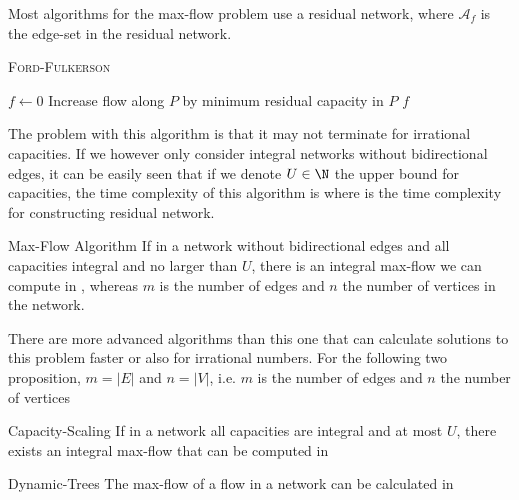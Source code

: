 \newpage
{}

Most algorithms for the max-flow problem use a residual network, where $\mathcal{A}_f$ is the edge-set in the residual network.

\begin{algorithm}
    \caption{\textsc{Ford-Fulkerson}}
    \begin{algorithmic}[1]
            \State $f \gets 0$ 
             
                \State Increase flow along $P$ by minimum residual capacity in $P$
            \EndWhile
            \State \Return $f$ 
        \EndProcedure
    \end{algorithmic}
\end{algorithm}

The problem with this algorithm is that it may not terminate for irrational capacities. If we however only consider integral networks without bidirectional edges, it can be easily seen that if we denote $U \in \N$ the upper bound for capacities, the time complexity of this algorithm is  where  is the time complexity for constructing residual network.
\begin{theorem}[]{Max-Flow Algorithm}
    If in a network without bidirectional edges and all capacities integral and no larger than $U$, there is an integral max-flow we can compute in , whereas $m$ is the number of edges and $n$ the number of vertices in the network.
\end{theorem}

There are more advanced algorithms than this one that can calculate solutions to this problem faster or also for irrational numbers.
For the following two proposition, $m = |E|$ and $n = |V|$, i.e. $m$ is the number of edges and $n$ the number of vertices

\begin{proposition}[]{Capacity-Scaling}
    If in a network all capacities are integral and at most $U$, there exists an integral max-flow that can be computed in 
\end{proposition}

\begin{proposition}[]{Dynamic-Trees}
    The max-flow of a flow in a network can be calculated in 
\end{proposition}



